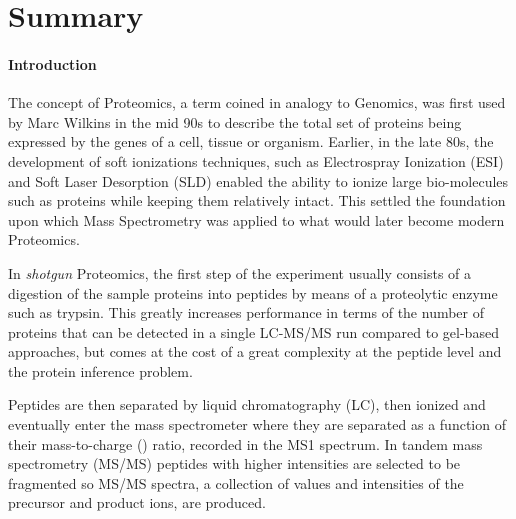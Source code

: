 %
%
%
%
%

\chapter{Summary}




\subsubsection*{Introduction}
The concept of Proteomics, a term coined in analogy to Genomics,
was first used by Marc Wilkins in the mid 90s to describe
the total set of proteins being expressed by the genes of a cell,
tissue or organism.
Earlier, in the late 80s, the development of soft ionizations techniques, 
such as Electrospray Ionization (ESI) and Soft Laser Desorption (SLD)
enabled the ability to ionize large bio-molecules such as proteins while
keeping them relatively intact. This settled the foundation upon which
Mass Spectrometry was applied to what would later become modern Proteomics.

In \textit{shotgun} Proteomics, the first step of the experiment usually
consists of a digestion of the sample proteins into peptides by means of
a proteolytic enzyme such as trypsin. This greatly increases performance
in terms of the number of proteins that can be detected in a single 
LC-MS/MS run compared to gel-based approaches, but comes at the cost 
of a great complexity at the peptide level and the protein inference problem. 

Peptides are then separated by liquid chromatography (LC), then ionized
and eventually enter the mass spectrometer where they are separated
as a function of their mass-to-charge (\mz) ratio, recorded in the MS1 spectrum.
In tandem mass spectrometry (MS/MS)
peptides with higher intensities are selected to be fragmented so 
MS/MS spectra, a collection of \mz values and intensities of the precursor and product ions, are produced.


